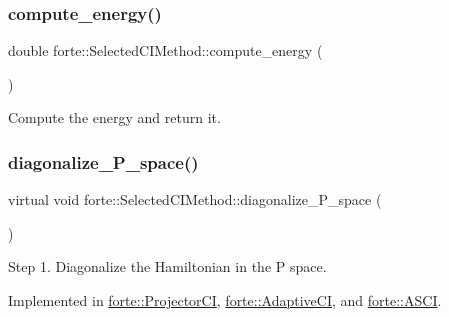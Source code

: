 \mbox{\label{classforte_1_1_selected_c_i_method_ada6462543804bed5d15d699ed06e182e}} 
\subsubsection{\texorpdfstring{compute\+\_\+energy()}{compute\_energy()}}
{\footnotesize\ttfamily double forte\+::\+Selected\+C\+I\+Method\+::compute\+\_\+energy (\begin{DoxyParamCaption}{ }\end{DoxyParamCaption})\hspace{0.3cm}{\ttfamily [virtual]}}



Compute the energy and return it. 

\mbox{\label{classforte_1_1_selected_c_i_method_a7b2b41da889659f03361f625c6df44d2}} 
\subsubsection{\texorpdfstring{diagonalize\+\_\+\+P\+\_\+space()}{diagonalize\_P\_space()}}
{\footnotesize\ttfamily virtual void forte\+::\+Selected\+C\+I\+Method\+::diagonalize\+\_\+\+P\+\_\+space (\begin{DoxyParamCaption}{ }\end{DoxyParamCaption})\hspace{0.3cm}{\ttfamily [pure virtual]}}



Step 1. Diagonalize the Hamiltonian in the P space. 



Implemented in \mbox{\hyperlink{classforte_1_1_projector_c_i_a2fc4f3f5094af2886237188e33f0f8ec}{forte\+::\+Projector\+CI}}, \mbox{\hyperlink{classforte_1_1_adaptive_c_i_a3673ea1f26ce6b24e35def54b14fe62f}{forte\+::\+Adaptive\+CI}}, and \mbox{\hyperlink{classforte_1_1_a_s_c_i_a25123db39a9f99b446741bc2ec738ee8}{forte\+::\+A\+S\+CI}}.

